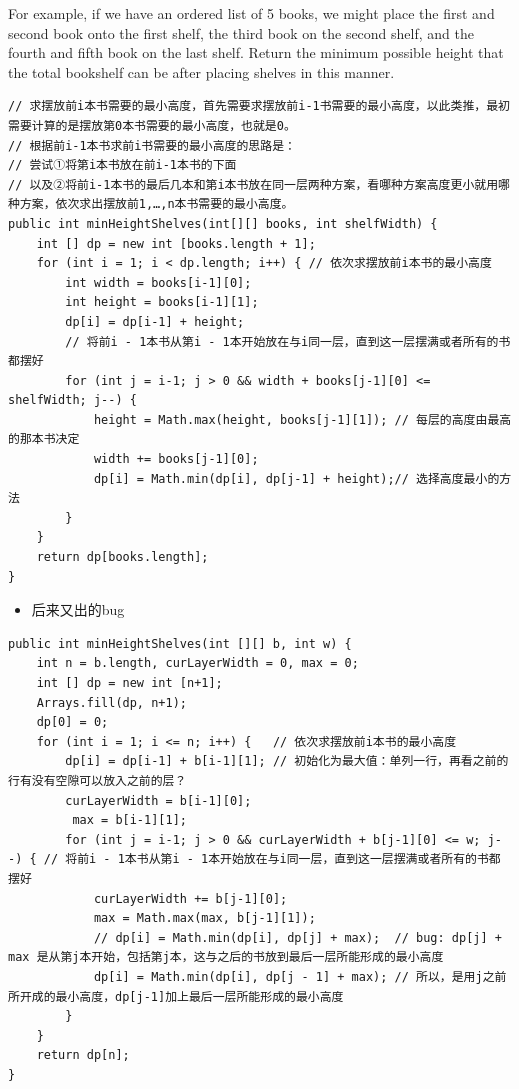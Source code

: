 \documentclass[9pt, b5paaper]{book}
\begin{document}
For example, if we have an ordered list of 5 books, we might place the first and second book onto the first shelf, the third book on the second shelf, and the fourth and fifth book on the last shelf.
Return the minimum possible height that the total bookshelf can be after placing shelves in this manner.
\begin{verbatim}
// 求摆放前i本书需要的最小高度，首先需要求摆放前i-1书需要的最小高度，以此类推，最初需要计算的是摆放第0本书需要的最小高度，也就是0。
// 根据前i-1本书求前i书需要的最小高度的思路是：
// 尝试①将第i本书放在前i-1本书的下面
// 以及②将前i-1本书的最后几本和第i本书放在同一层两种方案，看哪种方案高度更小就用哪种方案，依次求出摆放前1,…,n本书需要的最小高度。
public int minHeightShelves(int[][] books, int shelfWidth) {
    int [] dp = new int [books.length + 1];
    for (int i = 1; i < dp.length; i++) { // 依次求摆放前i本书的最小高度
        int width = books[i-1][0];
        int height = books[i-1][1];
        dp[i] = dp[i-1] + height;
        // 将前i - 1本书从第i - 1本开始放在与i同一层，直到这一层摆满或者所有的书都摆好
        for (int j = i-1; j > 0 && width + books[j-1][0] <= shelfWidth; j--) {
            height = Math.max(height, books[j-1][1]); // 每层的高度由最高的那本书决定
            width += books[j-1][0];
            dp[i] = Math.min(dp[i], dp[j-1] + height);// 选择高度最小的方法
        }
    }            
    return dp[books.length];
}
\end{verbatim}
\begin{itemize}
\item 后来又出的bug
\end{itemize}
\begin{verbatim}
public int minHeightShelves(int [][] b, int w) { 
    int n = b.length, curLayerWidth = 0, max = 0;
    int [] dp = new int [n+1];
    Arrays.fill(dp, n+1);
    dp[0] = 0;
    for (int i = 1; i <= n; i++) {   // 依次求摆放前i本书的最小高度
        dp[i] = dp[i-1] + b[i-1][1]; // 初始化为最大值：单列一行，再看之前的行有没有空隙可以放入之前的层？
        curLayerWidth = b[i-1][0];
         max = b[i-1][1];
        for (int j = i-1; j > 0 && curLayerWidth + b[j-1][0] <= w; j--) { // 将前i - 1本书从第i - 1本开始放在与i同一层，直到这一层摆满或者所有的书都摆好
            curLayerWidth += b[j-1][0];
            max = Math.max(max, b[j-1][1]);
            // dp[i] = Math.min(dp[i], dp[j] + max);  // bug: dp[j] + max 是从第j本开始，包括第j本，这与之后的书放到最后一层所能形成的最小高度
            dp[i] = Math.min(dp[i], dp[j - 1] + max); // 所以，是用j之前所开成的最小高度，dp[j-1]加上最后一层所能形成的最小高度
        }
    }
    return dp[n];
}
\end{verbatim}
\end{document}

